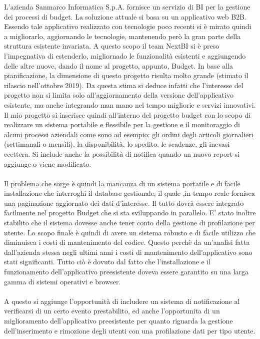 L'azienda Sanmarco Informatica S.p.A. fornisce un servizio di BI per la gestione dei processi di budget. La soluzione attuale si basa su un applicativo web B2B. Essendo tale applicativo realizzato con tecnologie poco recenti si è mirato quindi a migliorarlo, aggiornando le tecnologie, mantenendo però la gran parte della struttura esistente invariata.  A questo scopo il team NextBI si è preso l'impegnativa di estenderlo, migliornado le funzionalità esistenti e aggiungendo delle altre nuove, dando il nome al progetto, appunto, Budget. In base alla pianificazione, la dimensione di questo progetto risulta molto grande (stimato il rilascio nell'ottobre 2019). Da questa stima si deduce infatti che l'interesse del progetto non si limita solo all'aggiornamento della versione dell'applicativo esistente, ma anche integrando man mano nel tempo migliorie e servizi innovativi. Il mio progetto si inserisce quindi all'interno del progetto budget con lo scopo di realizzare un sistema portabile e flessibile per la gestione e il monitoraggio di alcuni processi aziendali come sono ad esempio: gli ordini degli articoli giornalieri (settimanali o mensili), la disponibilità, lo spedito, le scadenze, gli inevasi ecettera. Si include anche la possibilità di notifica quando un nuovo report si aggiunge o viene modificato. 
\\ \\
Il problema che sorge è quindi la mancanza di un sistema portatile e di facile installazione che interroghi il database gestionale, il quale ,in tempo reale fornisca una paginazione aggiornato dei dati d'interesse. Il tutto dovrà essere integrato facilmente nel progetto Budget che si sta sviluppando in parallelo. E' stato inoltre stabilito che il sistema dovesse anche tener conto della gestione di profilazione per utente. Lo scopo finale è quindi di avere un sistema robusto e di facile utilizzo che diminuisca i costi di mantenimento del codice. Questo perchè da un'analisi fatta dall'azienda stessa negli ultimi anni i costi di mantenimento dell'applicativo sono  stati significanti. Tutto ciò è dovuto dal fatto che l'installazione e il funzionamento dell'applicativo preesistente doveva essere garantito su una larga gamma di sistemi operativi e browser.
\\ \\
A questo si aggiunge l'opportunità di includere un sistema di notificazione al verificarsi di un certo evento prestabilito, ed anche l'opportunita di un miglioramento dell'applicativo preesistente per quanto riguarda  la gestione dell'inserimento e rimozione degli utenti con una profilazione dati per tipo utente.





